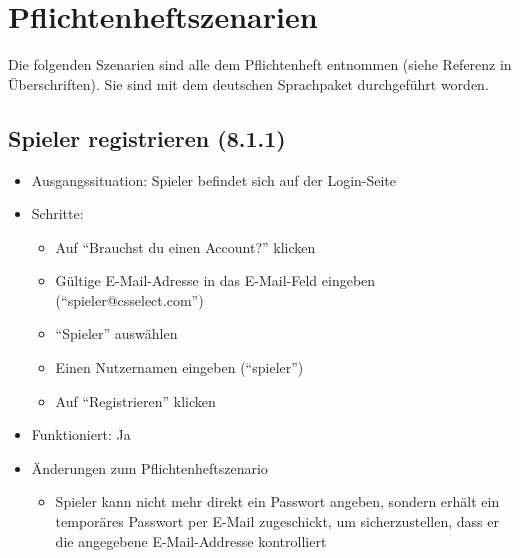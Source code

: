 \documentclass[a4paper]{scrreprt}
\begin{document}
        \section{Pflichtenheftszenarien}
        Die folgenden Szenarien sind alle dem Pflichtenheft entnommen (siehe Referenz in Überschriften). Sie sind mit dem deutschen Sprachpaket durchgeführt worden.

            \subsection{Spieler registrieren (8.1.1)}
            \begin{itemize}
                \item Ausgangssituation: Spieler befindet sich auf der Login-Seite
                \item Schritte:
                    \begin{itemize}
                        \item Auf \enquote{Brauchst du einen Account?} klicken
                        \item Gültige E-Mail-Adresse in das E-Mail-Feld eingeben (\enquote{spieler@csselect.com})
                        \item \enquote{Spieler} auswählen
                        \item Einen Nutzernamen eingeben (\enquote{spieler})
                        \item Auf \enquote{Registrieren} klicken
                    \end{itemize}
                \item Funktioniert: Ja
                \item Änderungen zum Pflichtenheftszenario
                \begin{itemize}
                    \item Spieler kann nicht mehr direkt ein Passwort angeben, sondern erhält ein temporäres Passwort per E-Mail zugeschickt,
                    um sicherzustellen, dass er die angegebene E-Mail-Addresse kontrolliert
                \end{itemize}
            \end{itemize}
\end{document}
